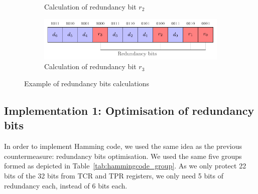 \begin{figure}[ht]
\begin{subfigure}[b]{0.49\textwidth}
        \caption{Calculation of redundancy bit $r_2$}
        \label{fig:hamming_code_example_4}
    \end{subfigure}
    \hfill
    \begin{subfigure}[b]{0.49\textwidth}
        \includegraphics[width=\textwidth, page=10]{c5_countermeasures_dift/img/hamming_bit.pdf}
        \caption{Calculation of redundancy bit $r_3$}
        \label{fig:hamming_code_example_5}
    \end{subfigure}
    \caption{Example of redundancy bits calculations}
    \label{fig:hamming_code_example}
\end{figure}

\subsection{Implementation 1: Optimisation of redundancy bits}

In order to implement Hamming code, we used the same idea as the previous countermeasure: redundancy bits optimisation. We used the same five groups formed as depicted in Table~\ref{tab:hammingcode_group}. As we only protect 22 bits of the 32 bits from TCR and TPR registers, we only need 5 bits of redundancy each, instead of 6 bits each.

